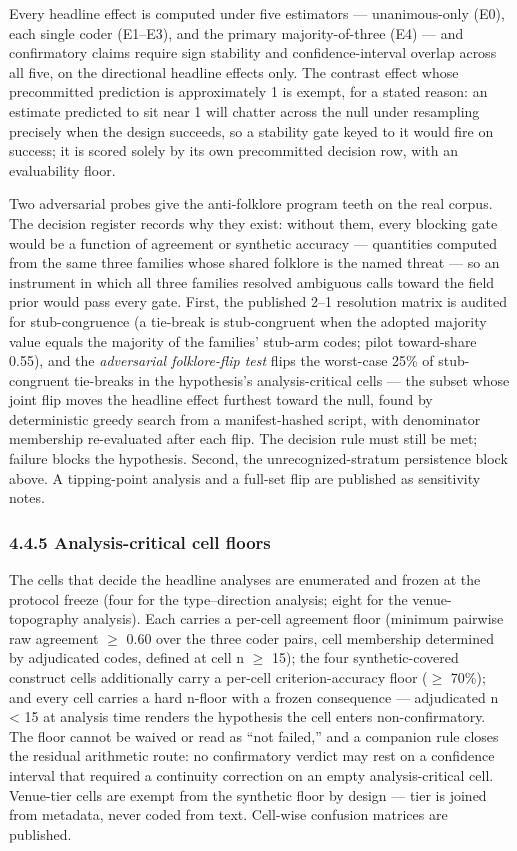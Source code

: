 Every headline effect is computed under five estimators --- unanimous-only (E0), each single coder (E1--E3), and the primary majority-of-three (E4) --- and confirmatory claims require sign stability and confidence-interval overlap across all five, on the directional headline effects only. The contrast effect whose precommitted prediction is approximately 1 is exempt, for a stated reason: an estimate predicted to sit near 1 will chatter across the null under resampling precisely when the design succeeds, so a stability gate keyed to it would fire on success; it is scored solely by its own precommitted decision row, with an evaluability floor.

Two adversarial probes give the anti-folklore program teeth on the real corpus. The decision register records why they exist: without them, every blocking gate would be a function of agreement or synthetic accuracy --- quantities computed from the same three families whose shared folklore is the named threat --- so an instrument in which all three families resolved ambiguous calls toward the field prior would pass every gate. First, the published 2--1 resolution matrix is audited for stub-congruence (a tie-break is stub-congruent when the adopted majority value equals the majority of the families' stub-arm codes; pilot toward-share 0.55), and the \emph{adversarial folklore-flip test} flips the worst-case 25\% of stub-congruent tie-breaks in the hypothesis's analysis-critical cells --- the subset whose joint flip moves the headline effect furthest toward the null, found by deterministic greedy search from a manifest-hashed script, with denominator membership re-evaluated after each flip. The decision rule must still be met; failure blocks the hypothesis. Second, the unrecognized-stratum persistence block above. A tipping-point analysis and a full-set flip are published as sensitivity notes.

\subsubsection{4.4.5 Analysis-critical cell floors}\label{analysis-critical-cell-floors}

The cells that decide the headline analyses are enumerated and frozen at the protocol freeze (four for the type--direction analysis; eight for the venue-topography analysis). Each carries a per-cell agreement floor (minimum pairwise raw agreement $\ge$ 0.60 over the three coder pairs, cell membership determined by adjudicated codes, defined at cell n $\ge$ 15); the four synthetic-covered construct cells additionally carry a per-cell criterion-accuracy floor ($\ge$ 70\%); and every cell carries a hard n-floor with a frozen consequence --- adjudicated n \textless{} 15 at analysis time renders the hypothesis the cell enters non-confirmatory. The floor cannot be waived or read as ``not failed,'' and a companion rule closes the residual arithmetic route: no confirmatory verdict may rest on a confidence interval that required a continuity correction on an empty analysis-critical cell. Venue-tier cells are exempt from the synthetic floor by design --- tier is joined from metadata, never coded from text. Cell-wise confusion matrices are published.

